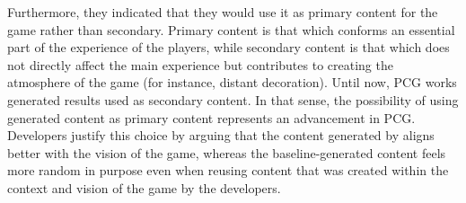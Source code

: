 Furthermore, they indicated that they would use it as primary content for the game rather than secondary. Primary content is that which conforms an essential part of the experience of the players, while secondary content is that which does not directly affect the main experience but contributes to creating the atmosphere of the game (for instance, distant decoration). Until now, PCG works generated results used as secondary content. In that sense, the possibility of using generated content as primary content represents an advancement in PCG. Developers justify this choice by arguing that the content generated by \ApproachName{} aligns better with the vision of the game, whereas the baseline-generated content feels more random in purpose even when reusing content that was created within the context and vision of the game by the developers.

